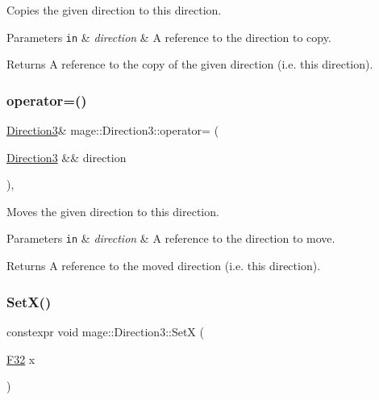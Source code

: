 Copies the given direction to this direction.


\begin{DoxyParams}[1]{Parameters}
\mbox{\tt in}  & {\em direction} & A reference to the direction to copy. \\
\hline
\end{DoxyParams}
\begin{DoxyReturn}{Returns}
A reference to the copy of the given direction (i.\+e. this direction). 
\end{DoxyReturn}
\mbox{\label{structmage_1_1_direction3_a02823d74126254434d8288f103e67fe6}} 
\subsubsection{\texorpdfstring{operator=()}{operator=()}\hspace{0.1cm}{\footnotesize\ttfamily [2/2]}}
{\footnotesize\ttfamily \mbox{\hyperlink{structmage_1_1_direction3}{Direction3}}\& mage\+::\+Direction3\+::operator= (\begin{DoxyParamCaption}\item[{\mbox{\hyperlink{structmage_1_1_direction3}{Direction3}} \&\&}]{direction }\end{DoxyParamCaption})\hspace{0.3cm}{\ttfamily [default]}, {\ttfamily [noexcept]}}

Moves the given direction to this direction.


\begin{DoxyParams}[1]{Parameters}
\mbox{\tt in}  & {\em direction} & A reference to the direction to move. \\
\hline
\end{DoxyParams}
\begin{DoxyReturn}{Returns}
A reference to the moved direction (i.\+e. this direction). 
\end{DoxyReturn}
\mbox{\label{structmage_1_1_direction3_a0c2b501a6e30261d872227bb73be8914}} 
\subsubsection{\texorpdfstring{Set\+X()}{SetX()}}
{\footnotesize\ttfamily constexpr void mage\+::\+Direction3\+::\+SetX (\begin{DoxyParamCaption}\item[{\mbox{\hyperlink{namespacemage_aa97e833b45f06d60a0a9c4fc22ae02c0}{F32}}}]{x }\end{DoxyParamCaption})\hspace{0.3cm}{\ttfamily [noexcept]}}

